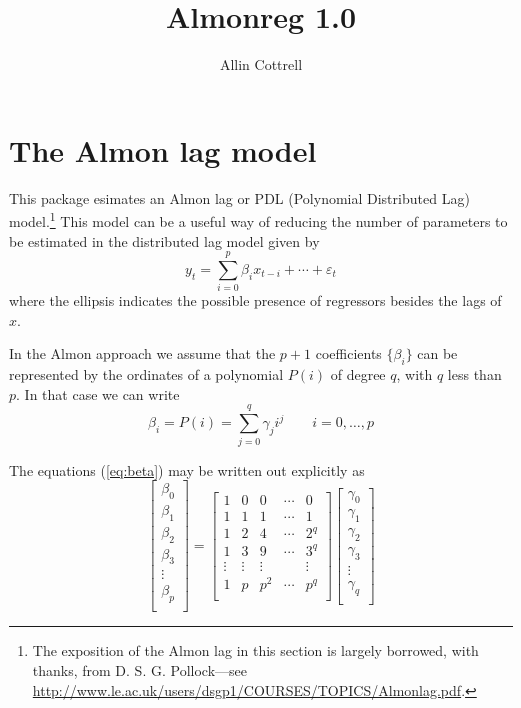 \documentclass{article}
\begin{document}
\setlength{\parindent}{0pt}
\setlength{\parskip}{1ex}

\title{Almonreg 1.0}
\author{Allin Cottrell}
\maketitle

\section{The Almon lag model}

This package esimates an Almon lag or PDL (Polynomial Distributed Lag)
model.\footnote{The exposition of the Almon lag in this section is
  largely borrowed, with thanks, from D. S. G. Pollock---see
  \url{http://www.le.ac.uk/users/dsgp1/COURSES/TOPICS/Almonlag.pdf}.}
This model can be a useful way of reducing the number of parameters to
be estimated in the distributed lag model given by
%
\begin{equation}
\label{eq:dl}
y_t = \sum_{i=0}^p \beta_i x_{t-i} + \cdots + \varepsilon_t
\end{equation}
%
where the ellipsis indicates the possible presence of regressors
besides the lags of $x$.

In the Almon approach we assume that the $p+1$ coefficients
$\{\beta_i\}$ can be represented by the ordinates of a polynomial
$P(i)$ of degree $q$, with $q$ less than $p$. In that case we can
write
%
\begin{equation}
\label{eq:beta}
\beta_i = P(i) = \sum_{j=0}^q \gamma_j i^j \qquad i=0,\dots,p
\end{equation}

The equations (\ref{eq:beta}) may be written out explicitly as
%
\begin{equation*}
\left[
\begin{array}{c}
\beta_0 \\
\beta_1 \\
\beta_2 \\
\beta_3 \\
\vdots \\
\beta_p \\
\end{array}
\right]
=
\left[
  \begin{array}{ccccc}
1 & 0 & 0 & \cdots & 0 \\
1 & 1 & 1 & \cdots & 1 \\
1 & 2 & 4 & \cdots & 2^q \\
1 & 3 & 9 & \cdots & 3^q \\
\vdots & \vdots & \vdots & & \vdots \\
1 & p & p^2 & \cdots & p^q \\
\end{array}
\right]
\left[
\begin{array}{c}
\gamma_0 \\
\gamma_1 \\
\gamma_2 \\
\gamma_3 \\
\vdots \\
\gamma_q \\
\end{array}
\right]
\end{equation*}
\end{document}
